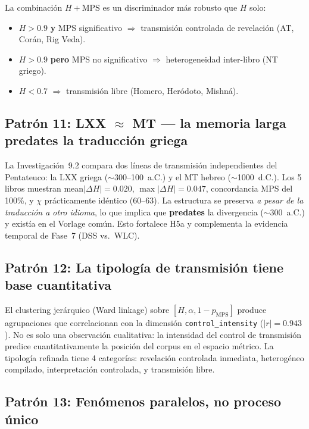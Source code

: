 \documentclass[12pt,a4paper]{article}
\begin{document}
La combinaci\'on $H + \text{MPS}$ es un discriminador m\'as robusto que $H$ solo:
\begin{itemize}[leftmargin=2em]
\item $H > 0.9$ \textbf{y} MPS significativo $\Rightarrow$ transmisi\'on controlada
      de revelaci\'on (AT, Cor\'an, Rig Veda).
\item $H > 0.9$ \textbf{pero} MPS no significativo $\Rightarrow$ heterogeneidad
      inter-libro (NT griego).
\item $H < 0.7$ $\Rightarrow$ transmisi\'on libre (Homero, Her\'odoto, Mishn\'a).
\end{itemize}

\subsection{Patr\'on 11: LXX $\approx$ MT --- la memoria larga predates la traducci\'on griega}

La Investigaci\'on~9.2 compara dos l\'ineas de transmisi\'on independientes del
Pentateuco: la LXX griega ($\sim$300--100~a.C.) y el MT hebreo ($\sim$1000~d.C.).
Los 5 libros muestran mean$|\Delta H| = 0.020$, $\max|\Delta H| = 0.047$,
concordancia MPS del 100\%, y $\chi$ pr\'acticamente id\'entico (60--63).
La estructura se preserva \emph{a pesar de la traducci\'on a otro idioma},
lo que implica que \textbf{predates} la divergencia ($\sim$300~a.C.) y exist\'ia
en el Vorlage com\'un. Esto fortalece H5a y complementa la evidencia temporal
de Fase~7 (DSS vs.\ WLC).

\subsection{Patr\'on 12: La tipolog\'ia de transmisi\'on tiene base cuantitativa}

El clustering jer\'arquico (Ward linkage) sobre $[H, \alpha, 1-p_{\text{MPS}}]$
produce agrupaciones que correlacionan con la dimensi\'on \texttt{control\_intensity}
($|r| = 0.943$). No es solo una observaci\'on cualitativa: la intensidad del
control de transmisi\'on predice cuantitativamente la posici\'on del corpus en el
espacio m\'etrico. La tipolog\'ia refinada tiene 4 categor\'ias: revelaci\'on controlada
inmediata, heterog\'eneo compilado, interpretaci\'on controlada, y transmisi\'on libre.

\subsection{Patr\'on 13: Fen\'omenos paralelos, no proceso \'unico}
\end{document}
